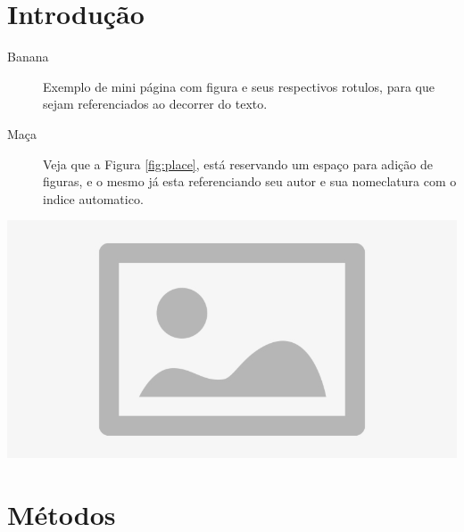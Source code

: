 
\section{Introdução}




\noindent \begin{minipage}[c]{0.6\textwidth}
  \vspace {1cm}
  \begin{description}
    \item [Banana] Exemplo de mini página com figura e seus respectivos rotulos, para que sejam referenciados ao decorrer do texto.
    \item [Maça] Veja que a Figura \ref{fig:place}, está reservando um espaço para adição de figuras, e o mesmo já esta referenciando seu autor e sua nomeclatura com o indice automatico.
  \end{description}

\end{minipage}
\begin{minipage}[c]{0.4\textwidth}

  \includegraphics[width=\textwidth]{figure/placeholder.jpg}
  	\label{fig:place}
\end{minipage}


\section{Métodos}


